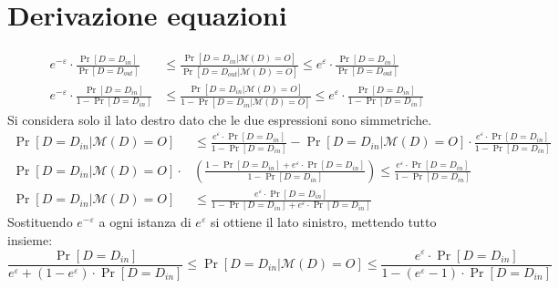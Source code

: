 \chapter{Derivazione equazioni}
\begin{equationderivation}[\ref{eq:mid_information_gain}]
\label{eqd:information_gain_derivation}
\begin{align*}
    e^{-\varepsilon} \cdot \frac{\Pr[D = D_{in}]}{\Pr[D = D_{out}]} &\le \frac{\Pr[D = D_{in} | \mathcal{M}(D) = O]}{\Pr[D = D_{out} | \mathcal{M}(D) = O]} \le e^{\varepsilon} \cdot \frac{\Pr[D = D_{in}]}{\Pr[D = D_{out}]}\\
    e^{-\varepsilon} \cdot \frac{\Pr[D = D_{in}]}{1-\Pr[D = D_{in}]} &\le \frac{\Pr[D = D_{in} | \mathcal{M}(D) = O]}{1-\Pr[D = D_{in} | \mathcal{M}(D) = O]} \le e^\varepsilon \cdot \frac{\Pr[D = D_{in}]}{1-\Pr[D = D_{in}]}
\end{align*}
Si considera solo il lato destro dato che le due espressioni sono simmetriche.
\begin{align*}
    \Pr[D = D_{in} | \mathcal{M}(D) = O] &\le \frac{e^\varepsilon \cdot \Pr[D = D_{in}]}{1 - \Pr[D = D_{in}]} - \Pr[D = D_{in} | \mathcal{M}(D) = O] \cdot \frac{e^\varepsilon \cdot \Pr[D = D_{in}]}{1 - \Pr[D = D_{in}]}\\
    \Pr[D = D_{in} | \mathcal{M}(D) = O] \cdot &\left(\frac{1 - \Pr[D = D_{in}] + e^\varepsilon \cdot \Pr[D = D_{in}]}{1 - \Pr[D = D_{in}]}\right) \le \frac{e^\varepsilon \cdot \Pr[D = D_{in}]}{1-\Pr[D = D_{in}]}\\
    \Pr[D = D_{in} | \mathcal{M}(D) = O] &\le \frac{e^\varepsilon \cdot \Pr[D = D_{in}]}{1 - \Pr[D = D_{in}] + e^\varepsilon \cdot \Pr[D = D_{in}]}
\end{align*}
Sostituendo $e^{-\varepsilon}$ a ogni istanza di $e^\varepsilon$ si ottiene il lato sinistro, mettendo tutto insieme:
\begin{equation*}
    \frac{\Pr[D = D_{in}]}{e^\varepsilon + (1 - e^\varepsilon) \cdot \Pr[D = D_{in}]} \le \Pr[D = D_{in} | \mathcal{M}(D) = O] \le \frac{e^\varepsilon \cdot \Pr[D = D_{in}]}{1 - (e^\varepsilon - 1) \cdot \Pr[D = D_{in}]}
\end{equation*}
\end{equationderivation}